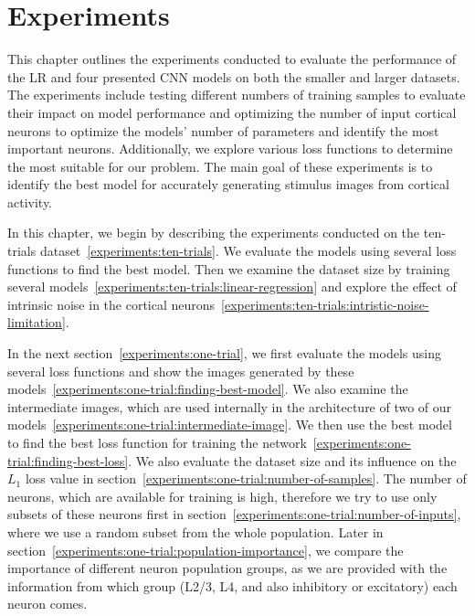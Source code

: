 \chapter{Experiments}
\label{experiments}
This chapter outlines the experiments conducted to evaluate the performance of the LR and four presented CNN models on both the smaller and larger datasets. The experiments include testing different numbers of training samples to evaluate their impact on model performance and optimizing the number of input cortical neurons to optimize the models' number of parameters and identify the most important neurons. Additionally, we explore various loss functions to determine the most suitable for our problem. The main goal of these experiments is to identify the best model for accurately generating stimulus images from cortical activity.

In this chapter, we begin by describing the experiments conducted on the ten-trials dataset~\ref{experiments:ten-trials}. We evaluate the models using several loss functions to find the best model. Then we examine the dataset size by training several models~\ref{experiments:ten-trials:linear-regression} and explore the effect of intrinsic noise in the cortical neurons~\ref{experiments:ten-trials:intristic-noise-limitation}.

In the next section~\ref{experiments:one-trial}, we first evaluate the models using several loss functions and show the images generated by these models~\ref{experiments:one-trial:finding-best-model}. We also examine the intermediate images, which are used internally in the architecture of two of our models~\ref{experiments:one-trial:intermediate-image}. We then use the best model to find the best loss function for training the network~\ref{experiments:one-trial:finding-best-loss}. We also evaluate the dataset size and its influence on the $L_1$ loss value in section~\ref{experiments:one-trial:number-of-samples}. The number of neurons, which are available for training is high, therefore we try to use only subsets of these neurons first in section~\ref{experiments:one-trial:number-of-inputs}, where we use a random subset from the whole population. Later in section~\ref{experiments:one-trial:population-importance}, we compare the importance of different neuron population groups, as we are provided with the information from which group (L2/3, L4, and also inhibitory or excitatory) each neuron comes.


